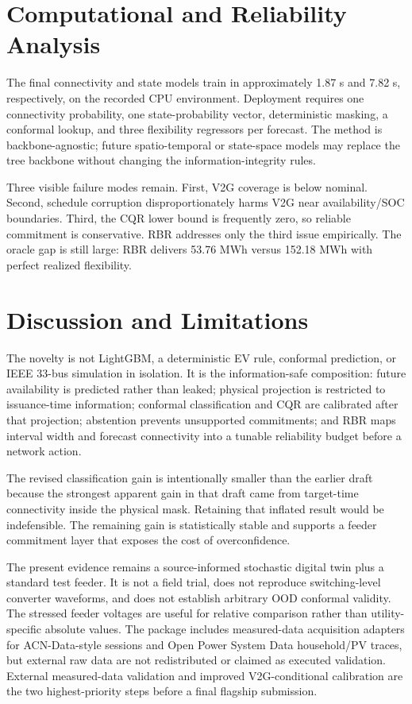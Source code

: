 \documentclass[journal]{IEEEtran}
\begin{document}
\section{Computational and Reliability Analysis}
The final connectivity and state models train in approximately 1.87 s and 7.82 s, respectively, on the recorded CPU environment. Deployment requires one connectivity probability, one state-probability vector, deterministic masking, a conformal lookup, and three flexibility regressors per forecast. The method is backbone-agnostic; future spatio-temporal or state-space models may replace the tree backbone without changing the information-integrity rules.

Three visible failure modes remain. First, V2G coverage is below nominal. Second, schedule corruption disproportionately harms V2G near availability/SOC boundaries. Third, the CQR lower bound is frequently zero, so reliable commitment is conservative. RBR addresses only the third issue empirically. The oracle gap is still large: RBR delivers 53.76 MWh versus 152.18 MWh with perfect realized flexibility.

\section{Discussion and Limitations}
The novelty is not LightGBM, a deterministic EV rule, conformal prediction, or IEEE 33-bus simulation in isolation. It is the information-safe composition: future availability is predicted rather than leaked; physical projection is restricted to issuance-time information; conformal classification and CQR are calibrated after that projection; abstention prevents unsupported commitments; and RBR maps interval width and forecast connectivity into a tunable reliability budget before a network action.

The revised classification gain is intentionally smaller than the earlier draft because the strongest apparent gain in that draft came from target-time connectivity inside the physical mask. Retaining that inflated result would be indefensible. The remaining gain is statistically stable and supports a feeder commitment layer that exposes the cost of overconfidence.

The present evidence remains a source-informed stochastic digital twin plus a standard test feeder. It is not a field trial, does not reproduce switching-level converter waveforms, and does not establish arbitrary OOD conformal validity. The stressed feeder voltages are useful for relative comparison rather than utility-specific absolute values. The package includes measured-data acquisition adapters for ACN-Data-style sessions and Open Power System Data household/PV traces, but external raw data are not redistributed or claimed as executed validation. External measured-data validation and improved V2G-conditional calibration are the two highest-priority steps before a final flagship submission.
\end{document}
